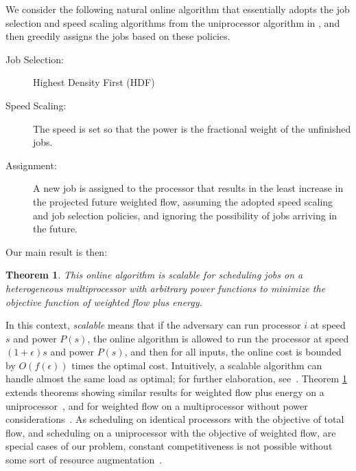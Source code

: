 \documentclass[11pt]{article}
\newtheorem{theorem}[lemma]{Theorem}
\begin{document}
We consider the following natural online algorithm that essentially adopts the
job selection and speed scaling algorithms from the uniprocessor
algorithm in \cite{BCP}, and then greedily assigns the jobs based on
these policies.
\begin{shadebox}
\begin{description}
\item[Job Selection:] Highest Density First (HDF)
\item[Speed Scaling:] The speed is set so that the power is the fractional
  weight of the unfinished jobs.
\item[Assignment:] A new job is assigned to the processor
  that results in the least increase in the projected future weighted
  flow, assuming the adopted speed scaling and job selection policies, and
  ignoring the possibility of jobs arriving in the future.
\end{description}
\end{shadebox}
Our main result is then:
\begin{theorem}
  \label{thm:main1}
  This online algorithm is scalable for scheduling jobs on a
  heterogeneous multiprocessor with arbitrary power functions to
  minimize the objective function of weighted flow plus energy.
\end{theorem}
In this context, \emph{scalable} means that if the adversary can run
processor $i$ at speed $s$ and power $P(s)$, the online algorithm is
allowed to run the processor at speed $(1+\epsilon)s$ and power $P(s)$,
and then for all inputs, the online cost is bounded by $O(f(\epsilon))$
times the optimal cost.  Intuitively,
a scalable algorithm can handle almost the same load as
optimal;  for further elaboration, see~\cite{PST,Pruhs07}.  Theorem
\ref{thm:main1} extends theorems showing similar results for weighted
flow plus energy on a uniprocessor~\cite{BCP,Lachlan2009}, and for
weighted flow on a multiprocessor without power
considerations~\cite{Chadha2009}.  As scheduling on identical processors
with the objective of total flow, and scheduling on a uniprocessor with
the objective of weighted flow, are special cases of our problem, constant
competitiveness is not possible without some sort of resource
augmentation~\cite{LR,BC09}.
\end{document}
